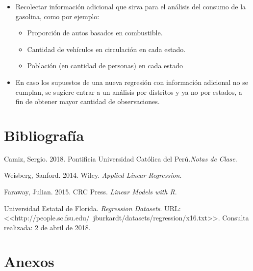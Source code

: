 \documentclass[a4paper,10pt]{article}\usepackage[]{graphicx}\usepackage[]{color}
\begin{document}
\begin{itemize}
  \item Recolectar información adicional que sirva para el análisis del consumo de la gasolina, como por ejemplo:
      \begin{itemize}
          \item Proporción de autos basados en combustible.
          \item Cantidad de vehículos en circulación en cada estado.
          \item Población (en cantidad de personas) en cada estado
      \end{itemize}
  \item En caso los supuestos de una nueva regresión con información adicional no se cumplan, se sugiere entrar a un análisis por distritos y ya no por estados, a fin de obtener mayor cantidad de observaciones.

\end{itemize}

\section{Bibliografía}
Camiz, Sergio. 2018. Pontificia Universidad Católica del Perú.\emph{Notas de Clase}.

Weisberg, Sanford. 2014. Wiley. \emph{Applied Linear Regression}.

Faraway, Julian. 2015. CRC Press. \emph{Linear Models with R}.

Universidad Estatal de Florida. \emph{Regression Datasets}. URL: <<http://people.sc.fsu.edu/~jburkardt/datasets/regression/x16.txt>>. Consulta realizada: 2 de abril de 2018.

\section{Anexos}
\end{document}
